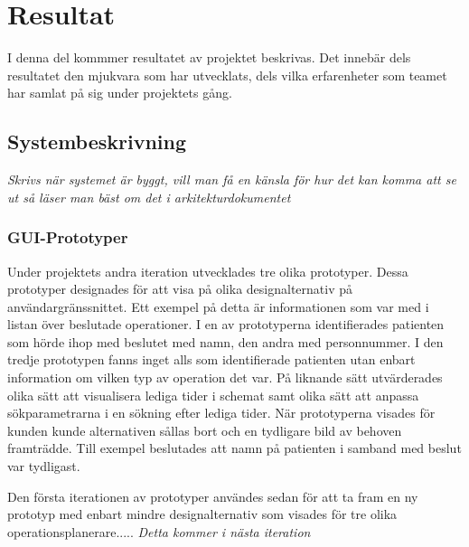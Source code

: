 \chapter{Resultat}
I denna del kommmer resultatet av projektet beskrivas. Det innebär dels
resultatet den mjukvara som har utvecklats, dels vilka erfarenheter som
teamet har samlat på sig under projektets gång.
\section{Systembeskrivning}
\textit{Skrivs när systemet är byggt, vill man få en känsla för hur det kan
komma att se ut så läser man bäst om det i arkitekturdokumentet}
\subsection{GUI-Prototyper}
Under projektets andra iteration utvecklades tre olika prototyper. Dessa
prototyper designades för att visa på olika designalternativ på
användargränssnittet. Ett exempel på detta är informationen som var med i listan
över beslutade operationer. I en av prototyperna identifierades patienten som hörde
ihop med beslutet med namn, den andra med personnummer. I den tredje prototypen
fanns inget alls som identifierade patienten utan enbart information om vilken
typ av operation det var. På liknande sätt utvärderades olika sätt att
visualisera lediga tider i schemat samt olika sätt att anpassa sökparametrarna i
en sökning efter lediga tider. När prototyperna visades för kunden kunde alternativen sållas bort och en tydligare bild av behoven framträdde.
Till exempel beslutades att namn på patienten i samband med beslut var tydligast.

Den första iterationen av prototyper användes sedan för att ta fram en ny
prototyp med enbart mindre designalternativ som visades för tre olika
operationsplanerare.....
\textit{Detta kommer i nästa iteration}
